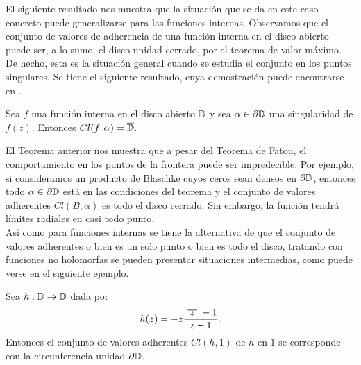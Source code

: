 
El siguiente resultado nos muestra que la situación que se da en este caso concreto puede generalizarse para las funciones internas. Observamos que el conjunto de valores de adherencia de una función interna en el disco abierto puede ser, a lo sumo, el disco unidad cerrado, por el teorema de valor máximo. De hecho, esta es la situación general cuando se estudia el conjunto en los puntos singulares. Se tiene el siguiente resultado, cuya demostración puede encontrarse en \citet[chap. 6]{garnett1981bounded}. \\

\begin{theorem}
    Sea $f$ una función interna en el disco abierto $\mathbb{D}$ y sea $\alpha \in \partial \mathbb{D}$ una singularidad de $f(z)$. Entonces $Cl(f, \alpha) = \overline{\mathbb{D}}$.
\end{theorem}

El Teorema anterior nos muestra que a pesar del Teorema de Fatou, el comportamiento en los puntos de la frontera puede ser impredecible. Por ejemplo, si consideramos un producto de Blaschke cuyos ceros sean densos en $\partial \mathbb{D}$, entonces todo $\alpha \in \partial \mathbb{D}$ está en las condiciones del teorema y el conjunto de valores adherentes $Cl(B, \alpha)$ es todo el disco cerrado. Sin embargo, la función tendrá límites radiales en casi todo punto. \\

Así como para funciones internas se tiene la alternativa de que el conjunto de valores adherentes o bien es un solo punto o bien es todo el disco, tratando con funciones no holomorfas se pueden presentar situaciones intermedias, como puede verse en el siguiente ejemplo. \\

\begin{example}
    Sea $h: \mathbb{D} \to \mathbb{D}$ dada por
    \begin{equation*}
        h(z) = -z \frac{\xbar{z} -1}{z - 1}.
    \end{equation*}
    Entonces el conjunto de valores adherentes $Cl(h,1)$ de $h$ en $1$ se corresponde con la circunferencia unidad $\partial \mathbb{D}$.
\end{example}

